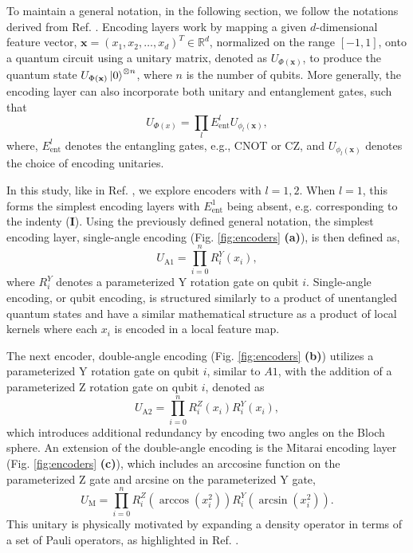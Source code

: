 \documentclass[journal=jacsat,manuscript=article]{achemso}
\begin{document}
To maintain a general notation, in the following section, we follow the notations derived from  Ref. \citep{suzuki_predicting_2020}.
Encoding layers work by mapping a given $d$-dimensional feature vector, $\mathbf{x}=(x_{1}, x_{2}, \ldots, x_{d})^{T} \in \mathbb{R}^{d}$, normalized on the range $[-1,1]$, onto a quantum circuit using a unitary matrix, denoted as $U_{\Phi(\mathbf{x})}$, to produce the quantum state $U_{\Phi(\mathbf{x})}\ket{0}^{\otimes n}$, where $n$ is the number of qubits.
More generally, the encoding layer can also incorporate both unitary and entanglement gates, such that 
\begin{equation}
	U_{\Phi(x)} =  \prod_{l} E_{\text{ent}}^{l} U_{\phi_{l}(\mathbf{x})},
	\label{eq:general_encoding}
\end{equation}
where, $E_{\text{ent}}^{l}$ denotes the entangling gates, e.g., CNOT or CZ, and  $U_{\phi_{l}(\mathbf{x})}$ denotes the choice of encoding unitaries. 

In this study, like in Ref. \citep{suzuki_predicting_2020}, we explore encoders with $l={1,2}$. 
When $l=1$, this forms the simplest encoding layers with $E_{\text{ent}}^{1}$ being absent, e.g. corresponding to the indenty ($\mathbf{I}$). 
Using the previously defined general notation, the simplest encoding layer, single-angle encoding (Fig. \ref{fig:encoders} \textbf{(a)}), is then defined as,
\begin{equation}
	U_{\text{A1}} = \prod_{i=0}^{n} R^{Y}_{i}(x_{i}),
	\label{eq:A1}
\end{equation}
where $R^{Y}_{i}$ denotes a parameterized Y rotation gate on qubit $i$.
Single-angle encoding, or qubit encoding, is structured similarly to a product of unentangled quantum states and have a similar mathematical structure as a product of local kernels where each $x_{i}$ is encoded in a local feature map.\cite{stoudenmire_supervised_2016,benedetti_parameterized_2019}

The next encoder, double-angle encoding (Fig. \ref{fig:encoders} \textbf{(b)}) utilizes a parameterized Y rotation gate on qubit $i$, similar to $A1$, with the addition of a parameterized Z rotation gate on qubit $i$, denoted as
\begin{equation}
	U_{\text{A2}} = \prod_{i=0}^{n}  R^{Z}_{i}(x_{i}) R^{Y}_{i}(x_{i}),
	\label{eq:A2}
\end{equation}
which introduces additional redundancy by encoding two angles on the Bloch sphere.
An extension of the double-angle encoding is the Mitarai encoding layer (Fig. \ref{fig:encoders} \textbf{(c)}), which includes an arccosine function on the parameterized Z gate and arcsine on the parameterized Y gate,
\begin{equation}
	U_{\text{M}}  = \prod_{i=0}^{n} R^{Z}_{i}(\arccos (x_{i}^{2})) R^{Y}_{i}(\arcsin (x_{i}^{2})).
	\label{eq:M}
\end{equation}
This unitary is physically motivated by expanding a density operator in terms of a set of Pauli operators, as highlighted in Ref. \cite{mitarai_quantum_2018}.
\end{document}
